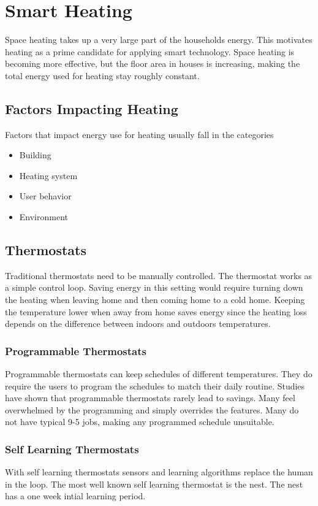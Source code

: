 \section{Smart Heating}
Space heating takes up a very large part of the households energy.
This motivates heating as a prime candidate for applying smart technology.
Space heating is becoming more effective, but the floor area in houses is increasing, making the total energy used for heating stay roughly constant.

\subsection{Factors Impacting Heating}
Factors that impact energy use for heating usually fall in the categories

\begin{itemize}
    \item Building
    \item Heating system
    \item User behavior
    \item Environment
\end{itemize}

\subsection{Thermostats}
Traditional thermostats need to be manually controlled.
The thermostat works as a simple control loop.
Saving energy in this setting would require turning down the heating when leaving home and then coming home to a cold home.
Keeping the temperature lower when away from home saves energy since the heating loss depends on the difference between indoors and outdoors temperatures. \\

\subsubsection{Programmable Thermostats}
Programmable thermostats can keep schedules of different temperatures.
They do require the users to program the schedules to match their daily routine.
Studies have shown that programmable thermostats rarely lead to savings.
Many feel overwhelmed by the programming and simply overrides the features.
Many do not have typical 9-5 jobs, making any programmed schedule unsuitable.

\subsubsection{Self Learning Thermostats}
With self learning thermostats sensors and learning algorithms replace the human in the loop.
The most well known self learning thermostat is the nest.
The nest has a one week intial learning period.\\

